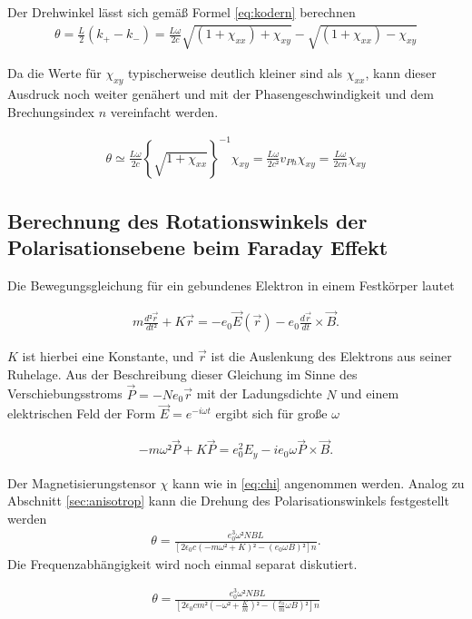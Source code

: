 Der Drehwinkel lässt sich gemäß Formel \eqref{eq:kodern} berechnen
\begin{align}
	\theta = \frac{L}{2}(k_+ -k_-) = \frac{L\omega}{2c}{ \sqrt{(1+ \chi_{xx} )+ \chi_{xy}} - \sqrt{(1+ \chi_{xx} )-\chi_{xy}} }
\end{align}

Da die Werte für $\chi_{xy}$ typischerweise deutlich kleiner sind als
$\chi_{xx}$, kann dieser Ausdruck noch weiter genähert und mit der
Phasengeschwindigkeit und dem Brechungsindex $n$ vereinfacht werden.

\begin{align}
	\theta \simeq \frac{L \omega}{2c}\left\{ \sqrt{1+\chi_{xx}}\right\}^{-1} \chi_{xy} =\frac{L \omega}{2c²} v_{Ph} \chi_{xy} = \frac{L \omega}{2c n} \chi_{xy}
\end{align}

\subsection{Berechnung des Rotationswinkels der Polarisationsebene beim Faraday Effekt \cite{man_a} }
Die Bewegungsgleichung für ein gebundenes Elektron in einem Festkörper lautet

\begin{align}
	m \frac{d² \vec{r}}{d t²} + K \vec{r} = -e_0 \vec{E}(\vec{r})- e_0 \frac{d \vec{r}}{dt} \times \vec{B}.
\end{align}

$K$ ist hierbei eine Konstante, und $\vec{r}$ ist die Auslenkung des Elektrons aus seiner Ruhelage.
Aus der Beschreibung dieser Gleichung im Sinne des Verschiebungsstroms $\vec{P} = -N e_0 \vec{r}$
mit der Ladungsdichte $N$
und einem elektrischen Feld der Form $\vec{E} = e^{- i \omega t}$ ergibt sich für große $\omega$

\begin{align}
	-m\omega² \vec{P} + K \vec{P} = e_0^2 E_y -i e_0 \omega \vec{P} \times \vec{B}.
\end{align}

Der Magnetisierungstensor $\chi$ kann wie in \eqref{eq:chi} angenommen werden.
Analog zu Abschnitt \ref{sec:anisotrop} kann die Drehung des
Polarisationswinkels festgestellt werden
\begin{align}
	\theta = \frac{e_0^3 \omega² NBL}{[2 \epsilon_0 c(-m\omega²+ K)² -(e_0 \omega B)²]n}.
\end{align}
Die Frequenzabhängigkeit wird noch einmal separat diskutiert.

\begin{align}
	\theta = \frac{e_0^3 \omega² NBL}{[2 \epsilon_0 c m²(-\omega²+ \frac{K}{m})² -(\frac{e_0}{m}\omega B)²]n}
\end{align}

